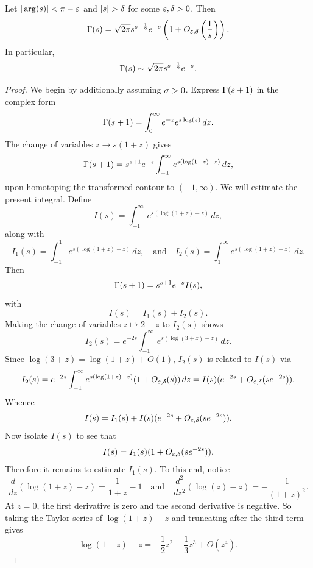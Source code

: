 \documentclass[12pt]{article}
\begin{document}
    \begin{theorem*}
      Let \(|\arg(s)| < \pi-\varepsilon\) and \(|s| > \delta\) for some \(\varepsilon,\delta > 0\). Then
      \[
        \Gamma(s) = \sqrt{2\pi}s^{s-\frac{1}{2}}e^{-s}\left(1+O_{\varepsilon,\delta}\left(\frac{1}{s}\right)\right).
      \]
      In particular,
      \[
        \Gamma(s) \sim \sqrt{2\pi}s^{s-\frac{1}{2}}e^{-s}.
      \]
    \end{theorem*}
    \begin{proof}
      We begin by additionally assuming \(\sigma > 0\). Express \(\Gamma(s+1)\) in the complex form
      \[
        \Gamma(s+1) = \int_{0}^{\infty}e^{-z}e^{s\log(z)}\,dz.
      \]
      The change of variables \(z \to s(1+z)\) gives
      \[
        \Gamma(s+1) = s^{s+1}e^{-s}\int_{-1}^{\infty}e^{s(\log(1+z)-z)}\,dz,
      \]
      upon homotoping the transformed contour to \((-1,\infty)\). We will estimate the present integral. Define
      \[
        I(s) = \int_{-1}^{\infty}e^{s(\log(1+z)-z)}\,dz,
      \]
      along with
      \[
        I_{1}(s) = \int_{-1}^{1}e^{s(\log(1+z)-z)}\,dz, \quad \text{and} \quad I_{2}(s) = \int_{1}^{\infty}e^{s(\log(1+z)-z)}\,dz.
      \]
      Then
      \begin{equation}\label{equ:Stirlings_formula_1}
        \Gamma(s+1) = s^{s+1}e^{-s}I(s),
      \end{equation}
      with
      \[
        I(s) = I_{1}(s)+I_{2}(s).
      \]
      Making the change of variables \(z \mapsto 2+z\) to \(I_{2}(s)\) shows
      \[
        I_{2}(s) = e^{-2s}\int_{-1}^{\infty}e^{s(\log(3+z)-z)}\,dz.
      \]
      Since \(\log(3+z) = \log(1+z)+O(1)\), \(I_{2}(s)\) is related to \(I(s)\) via
      \[
        I_{2}(s) = e^{-2s}\int_{-1}^{\infty}e^{s(\log(1+z)-z)}(1+O_{\varepsilon,\delta}(s))\,dz = I(s)(e^{-2s}+O_{\varepsilon,\delta}(se^{-2s})).
      \]
      Whence
      \[
        I(s) = I_{1}(s)+I(s)(e^{-2s}+O_{\varepsilon,\delta}(se^{-2s})).
      \]
      Now isolate \(I(s)\) to see that
      \begin{equation}\label{equ:Stirlings_formula_2}
        I(s) = I_{1}(s)(1+O_{\varepsilon,\delta}(se^{-2s})).
      \end{equation}
      Therefore it remains to estimate \(I_{1}(s)\). To this end, notice
      \[
        \frac{d}{dz}(\log(1+z)-z) = \frac{1}{1+z}-1 \quad \text{and} \quad \frac{d^{2}}{dz^{2}}(\log(z)-z) = -\frac{1}{(1+z)^{2}}.
      \]
      At \(z = 0\), the first derivative is zero and the second derivative is negative. So taking the Taylor series of \(\log(1+z)-z\) and truncating after the third term gives
      \[
        \log(1+z)-z = -\frac{1}{2}z^{2}+\frac{1}{3}z^{3}+O(z^{4}).
\]
\end{proof}
\end{document}
